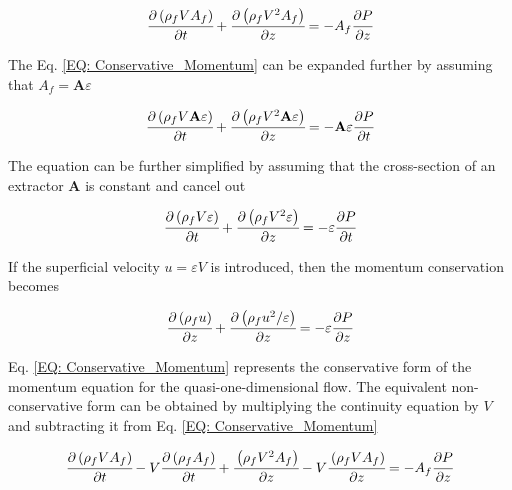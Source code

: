 \documentclass[../Article_Model_Parameters.tex]{subfiles}
\begin{document}
	{\footnotesize
		\begin{equation}
			\cfrac{\partial \left( \rho_f V A_f \right)}{\partial t} + \cfrac{\partial \left( \rho_f V^2 A_f \right)}{\partial z} = -A_f \cfrac{\partial P}{\partial z}
			\label{EQ: Conservative_Momentum}
		\end{equation}
	}

	The Eq. \ref{EQ: Conservative_Momentum} can be expanded further by assuming that $A_f = \textbf{A}\varepsilon$ 
	
	{\footnotesize
		\begin{equation}
			\cfrac{\partial \left( \rho_f V \textbf{A} \varepsilon \right) }{\partial t} + \cfrac{\partial \left( \rho_f V^2 \textbf{A} \varepsilon \right) }{\partial z} = - 	\textbf{A} \varepsilon \cfrac{\partial P}{\partial t}
		\end{equation}
	}

	The equation can be further simplified by assuming that the cross-section of an extractor $\textbf{A}$ is constant and cancel out
	
	{\footnotesize
		\begin{equation}
			\cfrac{\partial \left( \rho_f V \varepsilon \right) }{\partial t} + \cfrac{\partial \left( \rho_f V^2 \varepsilon \right) }{\partial z} = - \varepsilon 	\cfrac{\partial P}{\partial t}
		\end{equation}
	}

	If the superficial velocity $u=\varepsilon V$ is introduced, then the momentum conservation becomes
	
	{\footnotesize
		\begin{equation}
			\cfrac{\partial \left( \rho_f u \right)}{\partial z} + \cfrac{\partial \left( \rho_f u^2/\varepsilon \right) }{\partial z} = -\varepsilon \cfrac{\partial 	P}{\partial z}
		\end{equation}
	}

	Eq. \ref{EQ: Conservative_Momentum} represents the conservative form of the momentum equation for the quasi-one-dimensional flow. The equivalent non-conservative form can be obtained by multiplying the continuity equation by $V$ and subtracting it from Eq. \ref{EQ: Conservative_Momentum}
	
	{\footnotesize
		\begin{equation}
			\cfrac{\partial \left( \rho_f V A_f \right)}{\partial t} - V\cfrac{ \partial \left( \rho_f A_f \right) }{\partial t} + \cfrac{\left( \rho_f V^2 A_f 	\right)}{\partial z} - V \cfrac{\left( \rho_f V A_f \right)}{\partial z} = -A_f \cfrac{\partial P}{\partial z}
		\end{equation}
	}
	
\end{document}

